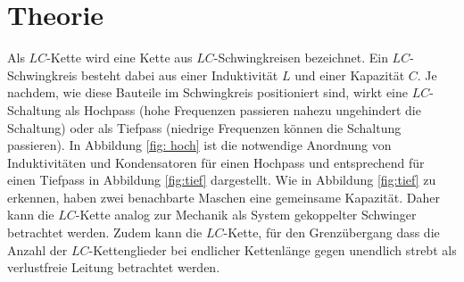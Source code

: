 \section{Theorie}
\label{sec:Theorie}
Als $LC$-Kette wird eine Kette aus $LC$-Schwingkreisen bezeichnet.
Ein $LC$-Schwingkreis besteht dabei aus einer Induktivität $L$ und einer Kapazität $C$. Je nachdem, wie diese Bauteile
im Schwingkreis positioniert sind, wirkt eine $LC$-Schaltung als Hochpass (hohe Frequenzen passieren nahezu ungehindert die Schaltung)
oder als Tiefpass (niedrige Frequenzen können die Schaltung passieren).
In Abbildung \ref{fig: hoch} ist die notwendige Anordnung von Induktivitäten
und Kondensatoren für einen Hochpass und entsprechend für einen Tiefpass in Abbildung \ref{fig:tief} dargestellt.
Wie in Abbildung \ref{fig:tief} zu erkennen, haben zwei benachbarte Maschen eine gemeinsame Kapazität. Daher kann die $LC$-Kette analog zur
Mechanik als System gekoppelter Schwinger betrachtet werden.
Zudem kann die $LC$-Kette, für den Grenzübergang dass die Anzahl der $LC$-Kettenglieder bei endlicher Kettenlänge gegen unendlich strebt als verlustfreie Leitung betrachtet werden.

